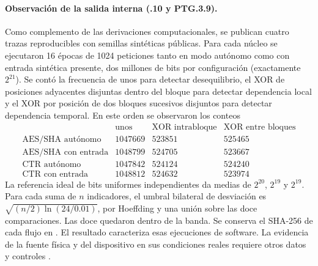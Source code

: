 \paragraph{Observación de la salida interna (.10 y PTG.3.9).}
Como complemento de las derivaciones computacionales, se publican cuatro trazas
reproducibles con semillas sintéticas públicas. Para cada núcleo se ejecutaron
16 épocas de 1024 peticiones tanto en modo autónomo como con entrada sintética
presente, dos millones de bits por configuración (exactamente \(2^{21}\)).
Se contó la frecuencia de unos para detectar desequilibrio, el XOR de posiciones
adyacentes disjuntas dentro del bloque para detectar dependencia local y el XOR
por posición de dos bloques sucesivos disjuntos para detectar dependencia temporal.
En este orden se observaron los conteos
\[
\begin{array}{lrrr}
 & \text{unos}&\text{XOR intrabloque}&\text{XOR entre bloques}\\
 \text{AES/SHA autónomo} &1047669&523851&525465\\
 \text{AES/SHA con entrada} &1048799&524705&523667\\
 \text{CTR autónomo} &1047842&524124&524240\\
 \text{CTR con entrada} &1048812&524632&523974
\end{array}
\]
La referencia ideal de bits uniformes independientes da medias de \(2^{20}\),
\(2^{19}\) y \(2^{19}\). Para cada suma de \(n\) indicadores, el umbral bilateral
de desviación es \(\sqrt{(n/2)\ln(24/0.01)}\), por Hoeffding y una unión sobre
las doce comparaciones. Las doce quedaron dentro de la banda. Se conserva el
SHA-256 de cada flujo en . El resultado
caracteriza esas ejecuciones de software. La evidencia de la fuente física y
del dispositivo en sus condiciones reales requiere otros datos y controles
\cite[§§157--162, 200 y 209]{ais}.
